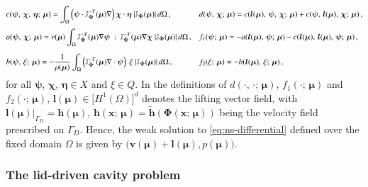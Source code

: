 \documentclass[longtitle]{elsarticle}
\numberwithin{equation}{section}
\theoremstyle{theorem}
\theoremstyle{definition}
\theoremstyle{remark}
\theoremstyle{proposition}
\numberwithin{figure}{section}
\newcommand{\wt}[1]{\widetilde{#1}}
\newcommand{\bg}[1]{\boldsymbol{#1}}
\begin{document}
		\begin{equation*}
			\begin{aligned}
				& c(\bg{\psi}, \, \bg{\chi}, \, \bg{\eta}; \, \bg{\mu}) = \int_{\Omega} \left( \bg{\psi} \cdot \mathbb{J}^{-T}_{\bg{\Phi}}(\bg{\mu}) \nabla \right) \bg{\chi} \cdot \bg{\eta} ~ \lvert \mathbb{J}_{\bg{\Phi}}(\bg{\mu}) \rvert \, d \Omega \, , \qquad && d(\bg{\psi}, \, \bg{\chi}; \, \bg{\mu}) = c(\bg{l}(\bg{\mu}), \, \bg{\psi}, \, \bg{\chi}; \, \bg{\mu}) + c(\bg{\psi}, \, \bg{l}(\bg{\mu}), \, \bg{\chi}; \, \bg{\mu}) \, , \\[0.1cm]
				& a(\bg{\psi}, \, \bg{\chi}; \, \bg{\mu}) = \nu(\bg{\mu}) \int_{\Omega} \mathbb{J}^{-T}_{\bg{\Phi}}(\bg{\mu}) \nabla \bg{\psi} ~ : ~ \mathbb{J}^{-T}_{\bg{\Phi}}(\bg{\mu}) \nabla \bg{\chi} ~ \lvert \mathbb{J}_{\bg{\Phi}}(\bg{\mu}) \rvert \, d \Omega \, , && f_1(\bg{\psi}; \, \bg{\mu}) = - a(\bg{l}(\bg{\mu}), \, \bg{\psi}; \, \bg{\mu}) - c(\bg{l}(\bg{\mu}), \, \bg{l}(\bg{\mu}), \, \bg{\psi}; \, \bg{\mu}) \, , \\[0.2cm]
				& b(\bg{\psi}, \, \xi; \, \bg{\mu}) = - \dfrac{1}{\rho(\bg{\mu})} \int_{\Omega} \left( \mathbb{J}^{-T}_{\bg{\Phi}}(\bg{\mu}) \nabla \cdot \bg{\psi} \right) ~ \xi ~ \lvert \mathbb{J}_{\bg{\Phi}}(\bg{\mu}) \rvert \, d \Omega \, , && f_2(\xi; \, \bg{\mu}) = - b(\bg{l}(\bg{\mu}), \, \xi; \, \bg{\mu}) \, ,
			\end{aligned}
			\vspace*{-0.1cm}
		\end{equation*}
		for all $\bg{\psi}$, $\bg{\chi}$, $\bg{\eta} \in X$ and $\xi \in Q$. In the definitions of $d(\cdot, \, \cdot; \, \bg{\mu})$, $f_1(\cdot; \, \bg{\mu})$ and $f_2(\cdot; \, \bg{\mu})$, $\bg{l}(\bg{\mu}) \in \big[ H^1(\Omega) \big]^d$ denotes the lifting vector field, with $\bg{l}(\bg{\mu}) \big\rvert_{\Gamma_D} = \bg{h}(\bg{\mu})$, $\bg{h}(\bg{x}; \, \bg{\mu}) = \wt{\bg{h}}(\bg{\Phi}(\bg{x}; \, \bg{\mu}))$ being the velocity field prescribed on $\Gamma_D$. Hence, the weak solution to \eqref{eq:ns-differential} defined over the fixed domain $\Omega$ is given by $\big( \bg{v}(\bg{\mu}) + \bg{l}(\bg{\mu}), p(\bg{\mu}) \big)$.
	
	
	
	\subsubsection{The lid-driven cavity problem}
	\label{section:The lid-driven cavity problem}
		
\end{document}
